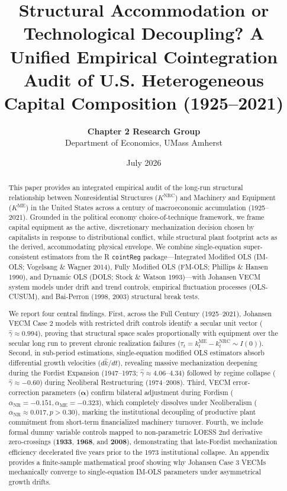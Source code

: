 \documentclass[11pt,a4paper]{article}
\title{\textbf{Structural Accommodation or Technological Decoupling? A Unified Empirical Cointegration Audit of U.S. Heterogeneous Capital Composition (1925--2021)}}
\author{\textbf{Chapter 2 Research Group} \\ Department of Economics, UMass Amherst}
\date{July 2026}
\begin{document}
\maketitle

\begin{abstract}
This paper provides an integrated empirical audit of the long-run structural relationship between Nonresidential Structures ($K^{\text{NRC}}$) and Machinery and Equipment ($K^{\text{ME}}$) in the United States across a century of macroeconomic accumulation (1925--2021). Grounded in the political economy choice-of-technique framework, we frame capital equipment as the active, discretionary mechanization decision chosen by capitalists in response to distributional conflict, while structural plant footprint acts as the derived, accommodating physical envelope. We combine single-equation super-consistent estimators from the R \texttt{cointReg} package---Integrated Modified OLS (IM-OLS; Vogelsang \& Wagner 2014), Fully Modified OLS (FM-OLS; Phillips \& Hansen 1990), and Dynamic OLS (DOLS; Stock \& Watson 1993)---with Johansen VECM system models under drift and trend controls, empirical fluctuation processes (OLS-CUSUM), and Bai-Perron (1998, 2003) structural break tests. 

We report four central findings. First, across the Full Century (1925--2021), Johansen VECM Case 2 models with restricted drift controls identify a secular unit vector ($\hat{\gamma} \approx 0.994$), proving that structural space scales proportionally with equipment over the secular long run to prevent chronic realization failures ($\tau_t = k^{\text{ME}}_t - k^{\text{NRC}}_t \sim I(0)$). Second, in sub-period estimations, single-equation modified OLS estimators absorb differential growth velocities ($d\hat{k}/dt$), revealing massive mechanization deepening during the Fordist Expansion (1947--1973; $\hat{\gamma} \approx 4.06$--$4.34$) followed by regime collapse ($\hat{\gamma} \approx -0.60$) during Neoliberal Restructuring (1974--2008). Third, VECM error-correction parameters ($\boldsymbol{\alpha}$) confirm bilateral adjustment during Fordism ($\alpha_{\text{NR}} = -0.151, \alpha_{\text{ME}} = -0.323$), which completely dissolves under Neoliberalism ($\alpha_{\text{NR}} \approx 0.017, p > 0.30$), marking the institutional decoupling of productive plant commitment from short-term financialized machinery turnover. Fourth, we include formal dummy variable controls mapped to non-parametric LOESS 2nd derivative zero-crossings (\textbf{1933}, \textbf{1968}, and \textbf{2008}), demonstrating that late-Fordist mechanization efficiency decelerated five years prior to the 1973 institutional collapse. An appendix provides a finite-sample mathematical proof showing why Johansen Case 3 VECMs mechanically converge to single-equation IM-OLS parameters under asymmetrical growth drifts.
\end{abstract}
\end{document}
